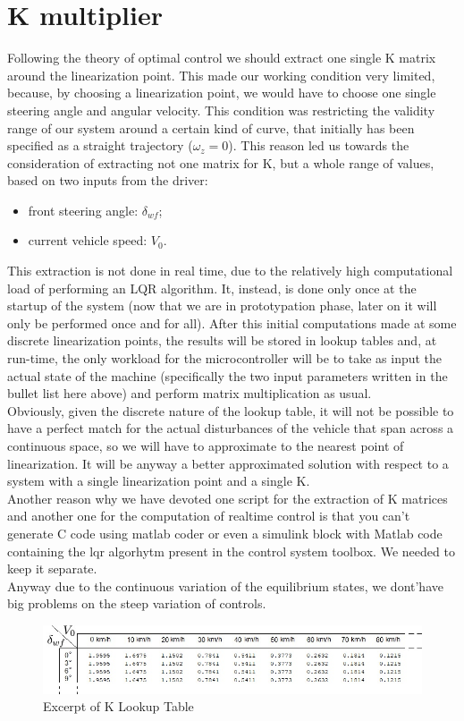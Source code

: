 \section{K multiplier}
Following the theory of optimal control we should extract one single K matrix around the linearization point. This made our working condition very limited, because, by choosing a linearization point, we would have to choose one single steering angle and angular velocity. This condition was restricting the validity range of our system around a certain kind of curve, that initially has been specified as a straight trajectory ($\omega_{z}=0$).
This reason led us towards the consideration of extracting not one matrix for K, but a whole range of values, based on two inputs from the driver:
\begin{itemize}
	\item front steering angle: $\delta_{wf}$;
	\item current vehicle speed: $V_0$.
\end{itemize}
This extraction is not done in real time, due to the relatively high computational load of performing an LQR algorithm. It, instead, is done only once at the startup of the system (now that we are in prototypation phase, later on it will only be performed once and for all). After this initial computations made at some discrete linearization points, the results will be stored in lookup tables and, at run-time, the only workload for the microcontroller will be to take as input the actual state of the machine (specifically the two input parameters written in the bullet list here above) and perform matrix multiplication as usual.\\
Obviously, given the discrete nature of the lookup table, it will not be possible to have a perfect match for the actual disturbances of the vehicle that span across a continuous space, so we will have to approximate to the nearest point of linearization. It will be anyway a better approximated solution with respect to a system with a single linearization point and a single K.\\
Another reason why we have devoted one script for the extraction of K matrices and another one for the computation of realtime control is that you can't generate C code using matlab coder or even a simulink block with Matlab code containing the lqr algorhytm present in the control system toolbox. We needed to keep it separate.\\
Anyway due to the continuous variation of the equilibrium states, we dont'have big problems on the steep variation of controls.
\begin{figure}[!h]
\includegraphics[width=\linewidth]{../Images/KLut.jpg}\caption{Excerpt of K Lookup Table}
\end{figure}
